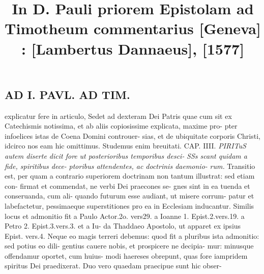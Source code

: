 \documentclass{article}
\begin{document}
\date{}
        \title{In D. Pauli priorem Epistolam ad Timotheum commentarius [Geneva] : [Lambertus Dannaeus], [1577]}
\maketitle

\begin{pages} 
\beginnumbering
        
\section*{AD I. PAVL. AD TIM. }
\marginpar{[ p.180 ]}explicatur fere in articulo, Sedet ad dexteram Dei Patris quae cum sit ex Catechismis notissima, et ab aliis copiosissime explicata, maxime pro- pter infoelices istas de Coena Domini controuer- sias, et de ubiquitate corporis Christi, idcirco nos eam hic omittimus. Studemus enim breuitati. CAP. IIII. \textit{PIRITuS autem diserte dicit fore} \textit{ut posterioribus temporibus desci-} \textit{SSs scant quidam a fide, spiritibus dece-} \textit{ptoribus attendentes, ac doctrinis daemonio-} \textit{rum.} Transitio est, per quam a contrario superiorem doctrinam non tantum illustrat: sed etiam con- firmat et commendat, ne verbi Dei praecones se- gnes sint in ea tuenda et conseruanda, cum ali- quando futurum esse audiant, ut misere corrum- patur et labefactetur, pessimaeque superstitiones pro ea in Ecclesiam inducantur. Similis locus et admonitio fit a Paulo Actor.2o. vers29. a Ioanne 1. Epist.2.vers.19. a Petro 2. Epist.3.vers.3. et a Iu- da Thaddaeo Apostolo, ut apparet ex ipsius Epist. vers.4. Neque eo magis terreri debemus: quod fit a pluribus ista admonitio: sed potius eo dili- gentius cauere nobis, et prospicere ne decipia- mur: minusque offendamur oportet, cum huius- modi haereses obrepunt, quas fore iampridem spiritus Dei praedixerat. Duo vero quaedam praecipue sunt hic obser- 

\end{pages}
\end{document}

